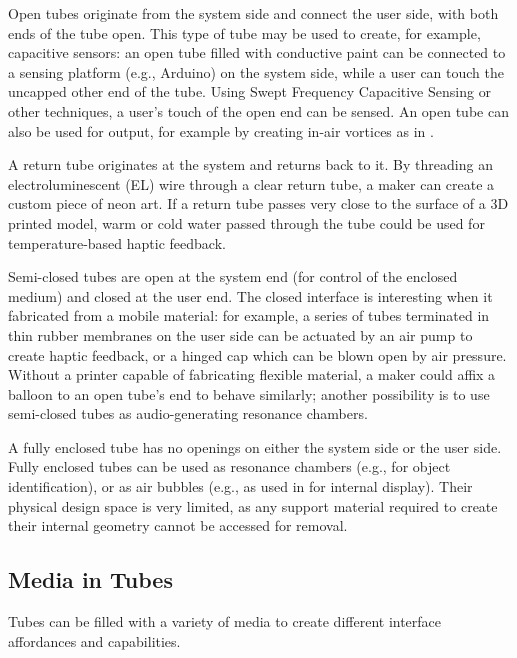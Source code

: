 Open tubes originate from the system side and connect the user side, with both ends of the tube open. This type of tube may be used to create, for example, capacitive sensors: an open tube filled with conductive paint can be connected to a sensing platform (e.g., Arduino) on the system side, while a user can touch the uncapped other end of the tube.  Using Swept Frequency Capacitive Sensing \cite{Sato-touche} or other techniques, a user's touch of the open end can be sensed.  An open tube can also be used for output, for example by creating in-air vortices as in \cite{Sodhi-aireal}.

A return tube originates at the system and returns back to it.  By threading an electroluminescent (EL) wire through a clear return tube, a maker can create a custom piece of neon art.  If a return tube passes very close to the surface of a 3D printed model, warm or cold water passed through the tube could be used for temperature-based haptic feedback.

Semi-closed tubes are open at the system end (for control of the enclosed medium) and closed at the user end.  The closed interface is interesting when it fabricated from a mobile material: for example, a series of tubes terminated in thin rubber membranes on the user side can be actuated by an air pump to create haptic feedback, or a hinged cap which can be blown open by air pressure.  Without a printer capable of fabricating flexible material, a maker could affix a balloon to an open tube's end to behave similarly; another possibility is to use semi-closed tubes as audio-generating resonance chambers.

A fully enclosed tube has no openings on either the system side or the user side.  Fully enclosed tubes can be used as resonance chambers (e.g., for object identification), or as air bubbles (e.g., as used in \cite{Willis-printedoptics} for internal display).     Their physical design space is very limited, as any support material required to create their internal geometry cannot be accessed for removal.

\subsection{Media in Tubes}

Tubes can be filled with a variety of media to create different interface affordances and capabilities.

